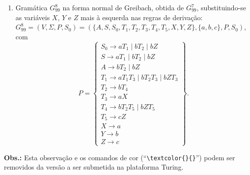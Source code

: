\documentclass[12pt]{article}
\def\myling{{99}} %
\begin{document}
{\begin{enumerate}
$$\begin{array}{l|ccccccccccc}
      \hline
      \textbf{Ordem} & 1 & 2 & 3 & 4 & 5 & 6 & 7 & 8 & 9 & 10 & 11\\
     \end{array}
    $$
  \item Gramática $G_{\myling}^8$ na forma normal de Greibach, obtida de $G_{\myling}^7$, substituindo-se as variáveis $X$, $Y$ e $Z$ mais à esquerda nas regras de derivação:\\
  $G_{\myling}^8=(V,\Sigma,P,S_0)=(\{A,S,S_0,T_1,T_2,T_3,T_4,T_5,X,Y,Z\},\{a,b,c\},P,S_0)$, com
    $$
     P =
     \left\{\begin{array}{l}
      S_0\to aT_1\mid bT_2\mid bZ\\
      S\to aT_1\mid bT_2\mid bZ\\
      A\to bT_2\mid bZ\\
      T_1\to aT_1T_3\mid bT_2T_3\mid bZT_3\\
      T_2\to bT_4\\
      T_3\to aX\\
      T_4\to bT_2T_5\mid bZT_5\\
      T_5\to cZ\\
      X\to a\\
      Y\to b\\
      Z\to c
     \end{array}\right\}.
    $$
\end{enumerate}
}
%
\noindent\textbf{Obs.:} Esta observação e os comandos de cor (``\verb|\textcolor{}{}|'') podem ser removidos da versão a ser submetida na plataforma Turing.
\end{document}
